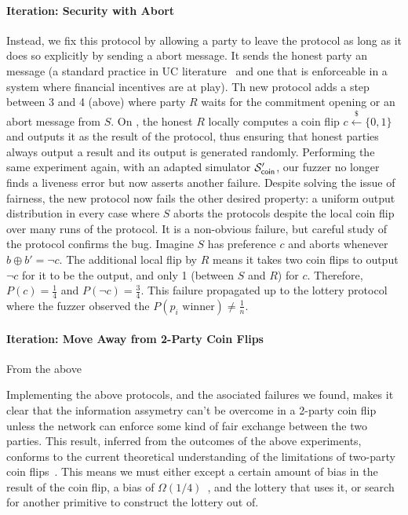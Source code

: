 {\paragraph{Iteration: Security with Abort}
Instead, we fix this protocol by allowing a party to leave the protocol as long as it does so explicitly
by sending a abort message.
It sends the honest party an  message (a standard practice in UC literature~\cite{common, abort, defs}
and one that is enforceable in a system where financial incentives are at play).  
Th new protocol adds a step between 3 and 4 (above) where party $R$ waits for
the commitment opening or an abort message from $S$.  On , the honest
$R$ locally computes a coin flip $c \xleftarrow{\$} \{0,1\}$ and outputs it as
the result of the protocol, thus ensuring that honest parties always output a
result and its output is generated randomly.
Performing the same experiment again, with an adapted simulator
$\mathcal{S}'_{{\mathsf {coin}}}$, our fuzzer no longer finds a liveness error but now asserts another failure.  Despite solving the issue
of fairness, the new protocol now fails the other desired property: a uniform 
output distribution in every case where $S$ aborts the protocols despite the local coin flip over many runs of the protocol.
It is a non-obvious failure, but careful study of the protocol
confirms the bug. Imagine $S$ has 
preference $c$ and aborts whenever $b \oplus b' = \neg c$.
The additional local flip by $R$ means it takes two coin flips to output $\neg c$ for it to be the output, and only 1 (between $S$ and $R$) for $c$.
Therefore, $P(c) = \frac{1}{4}$ and $P(\neg c) = \frac{3}{4}$.
This failure propagated up to the lottery protocol where the fuzzer observed the $P(p_i \text{ winner}) \neq \frac{1}{n}$.

\paragraph{Iteration: Move Away from 2-Party Coin Flips}
From the above 

Implementing the above protocols, and the asociated failures we found, makes it clear that the information assymetry can't be overcome in a 2-party coin flip unless the network can enforce some kind of fair exchange between the two parties.
This result, inferred from the outcomes of the above experiments, conforms to the current theoretical understanding of the limitations of two-party coin flips~\cite{two, party, coin, results}.
This means we must either except a certain amount of bias in the result of the coin flip, a bias of $\Omega (1/4)$~\cite{cleve, and the others}, and the lottery that uses it, or search for another primitive to construct the lottery out of. 


}
